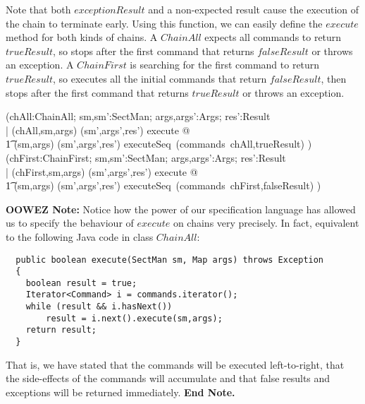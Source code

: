 \documentclass{llncs} %
\newenvironment{OOWEZ}{\textbf{OOWEZ Note: }}{\textbf{End Note.}}
\begin{document}
Note that both $exceptionResult$ and a non-expected result
cause the execution of the chain to terminate early.  
Using this function, we can easily define the $execute$ method
for both kinds of chains.
A $ChainAll$ expects all commands to return $trueResult$, so stops after
the first command that returns $falseResult$ or throws an exception.
A $ChainFirst$ is searching for the first command to return $trueResult$,
so executes all the initial commands that return $falseResult$, then stops
after the first command that returns $trueResult$ or throws an exception.
\begin{axdef}
\where
  (\forall chAll:ChainAll; sm,sm':SectMan; args,args':Args; res':Result \\
  | (chAll,sm,args) \mapsto (sm',args',res') \in execute @ \\
  \t1  (sm,args) \mapsto (sm',args',res') 
          \in executeSeq~(commands~chAll,trueResult) )
  \also
  (\forall chFirst:ChainFirst; sm,sm':SectMan; args,args':Args; res':Result \\
  | (chFirst,sm,args) \mapsto (sm',args',res') \in execute @ \\
  \t1  (sm,args) \mapsto (sm',args',res') 
          \in executeSeq~(commands~chFirst,falseResult) )
\end{axdef}

\begin{OOWEZ}
  Notice how the power of our specification language has allowed
  us to specify the behaviour of $execute$ on chains very precisely.
  In fact, equivalent to the following Java code in class $ChainAll$:
\begin{verbatim}
  public boolean execute(SectMan sm, Map args) throws Exception
  {
    boolean result = true;
    Iterator<Command> i = commands.iterator();
    while (result && i.hasNext())
        result = i.next().execute(sm,args);
    return result;
  }
\end{verbatim}
  That is, we have stated that the commands will be executed left-to-right, 
  that the side-effects of the commands will accumulate and 
  that false results and exceptions will be returned immediately.
\end{OOWEZ}

\end{document}
